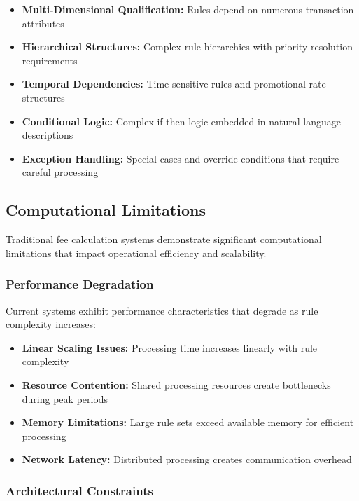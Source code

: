 \begin{itemize}
    \item \textbf{Multi-Dimensional Qualification:} Rules depend on numerous transaction attributes
    \item \textbf{Hierarchical Structures:} Complex rule hierarchies with priority resolution requirements
    \item \textbf{Temporal Dependencies:} Time-sensitive rules and promotional rate structures
    \item \textbf{Conditional Logic:} Complex if-then logic embedded in natural language descriptions
    \item \textbf{Exception Handling:} Special cases and override conditions that require careful processing
\end{itemize}

\subsection{Computational Limitations}

Traditional fee calculation systems demonstrate significant computational limitations that impact operational efficiency and scalability.

\subsubsection{Performance Degradation}

Current systems exhibit performance characteristics that degrade as rule complexity increases:

\begin{itemize}
   \item \textbf{Linear Scaling Issues:} Processing time increases linearly with rule complexity
   \item \textbf{Resource Contention:} Shared processing resources create bottlenecks during peak periods
   \item \textbf{Memory Limitations:} Large rule sets exceed available memory for efficient processing
   \item \textbf{Network Latency:} Distributed processing creates communication overhead
\end{itemize}

\subsubsection{Architectural Constraints}

